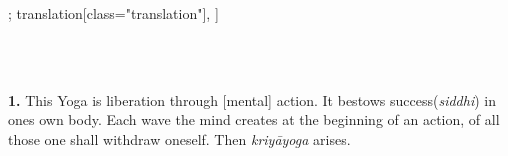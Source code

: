 \documentclass[12pt]{article}%
\def\om{\textrm{\foreignlanguage{english}{\footnotesize omitted in\ }}} %
\begin{document}
\begin{alignment}[
    texts=edition[class="edition"];
    translation[class="translation"],
    ]
\begin{edition}
\begin{tlg}
\\
\\
\end{tlg}
\end{edition}
\begin{translation}
\begin{tlate}\textbf{1.} This Yoga is liberation through [mental] action. It bestows success(\textit{siddhi}) in ones own body. Each wave the mind creates at the beginning of an action, of all those one shall withdraw oneself. Then \textit{kriyāyoga} arises. \bigskip \bigskip \end{tlate}
\end{translation}
  \begin{edition}
    \begin{tlg}

\end{tlg}
\end{edition}
\end{alignment}
\end{document}
